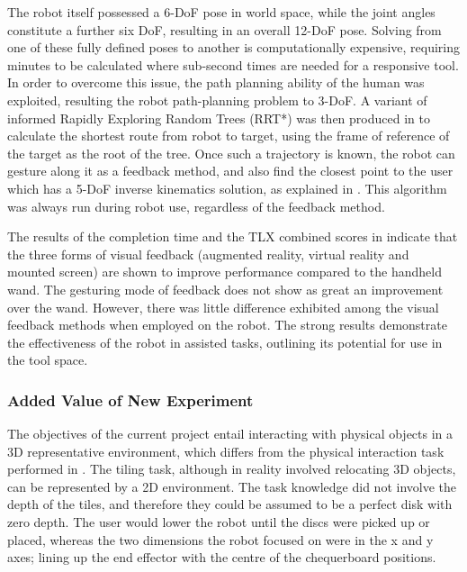 \documentclass[11pt]{article}
\begin{document}
The robot itself possessed a 6-DoF pose in world space, while the joint angles constitute a further six DoF, resulting in an overall 12-DoF pose. Solving from one of these fully defined poses to another is computationally expensive, requiring minutes to be calculated where sub-second times are needed for a responsive tool. In order to overcome this issue, the path planning ability of the human was exploited, resulting the robot path-planning problem to 3-DoF. A variant of informed Rapidly Exploring Random Trees (RRT*) \cite{Gammell2014} was then produced in \cite{GreggSmithFeedback} to calculate the shortest route from robot to target, using the frame of reference of the target as the root of the tree. Once such a trajectory is known, the robot can gesture along it as a feedback method, and also find the closest point to the user which has a 5-DoF inverse kinematics solution, as explained in \cite{GreggSmithKinematics}. This algorithm was always run during robot use, regardless of the feedback method.

The results of the completion time and the TLX combined scores in \cite{GreggSmithFeedback} indicate that the three forms of visual feedback (augmented reality, virtual reality and mounted screen) are shown to improve performance compared to the handheld wand. The gesturing mode of feedback does not show as great an improvement over the wand. However, there was little difference exhibited among the visual feedback methods when employed on the robot. The strong results demonstrate the effectiveness of the robot in assisted tasks, outlining its potential for use in the tool space.
	
\subsubsection{Added Value of New Experiment}
The objectives of the current project entail interacting with physical objects in a 3D representative environment, which differs from the physical interaction task performed in \cite{GreggSmithDesign}. The tiling task, although in reality involved relocating 3D objects, can be represented by a 2D environment. The task knowledge did not involve the depth of the tiles, and therefore they could be assumed to be a perfect disk with zero depth. The user would lower the robot until the discs were picked up or placed, whereas the two dimensions the robot focused on were in the x and y axes; lining up the end effector with the centre of the chequerboard positions.
\end{document}
